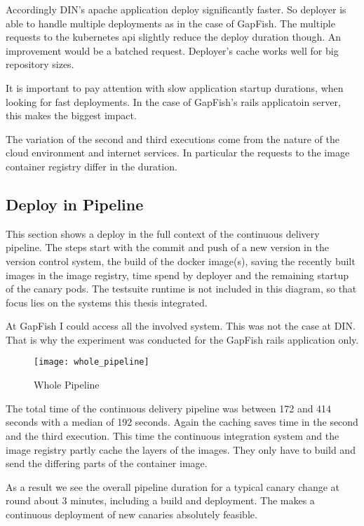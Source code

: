 Accordingly DIN's apache application deploy significantly faster. So deployer is able to
handle multiple deployments as in the case of GapFish. The multiple requests to the
kubernetes api slightly reduce the deploy duration though. An improvement would be a
batched request. Deployer's cache works well for big repository sizes.

It is important to pay attention with slow application startup durations, when looking for
fast deployments. In the case of GapFish's rails applicatoin server, this makes the
biggest impact.

The variation of the second and third executions come from the nature of the cloud
environment and internet services. In particular the requests to the image container
registry differ in the duration.

\subsection{Deploy in Pipeline}

This section shows a deploy in the full context of the continuous delivery pipeline. The
steps start with the commit and push of a new version in the version control system, the
build of the docker image(s), saving the recently built images in the image registry,
time spend by deployer and the remaining startup of the canary pods. The testsuite runtime
is not included in this diagram, so that focus lies on the systems this thesis integrated.

At GapFish I could access all the involved system. This was not the case at DIN. That is
why the experiment was conducted for the GapFish rails application only.

\begin{figure}[htbp]
  \centering
  \texttt{[image: whole\_pipeline]}
  \caption[Metric Comparison]{Whole Pipeline}
  \label{fig:whole pipeline}
\end{figure}

The total time of the continuous delivery pipeline was between 172 and 414 seconds with a
median of 192 seconds. Again the caching saves time in the second and the third
execution. This time the continuous integration system and the image registry partly
cache the layers of the images. They only have to build and send the differing parts of
the container image.

As a result we see the overall pipeline duration for a typical canary change at round
about 3 minutes, including a build and deployment. The makes a continuous deployment of
new canaries absolutely feasible.

